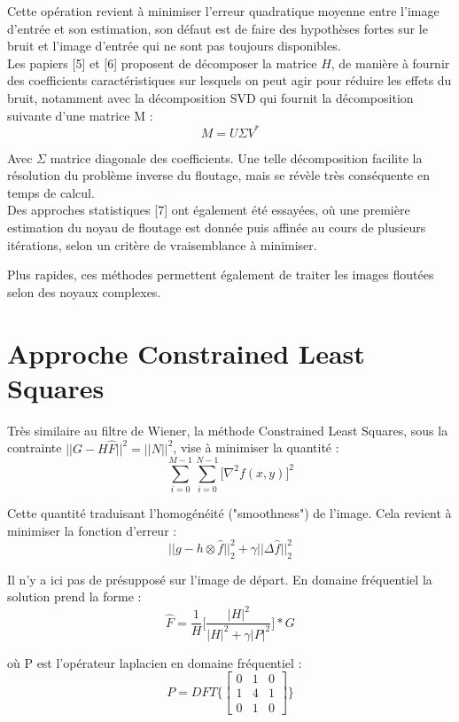 \documentclass{article}
\begin{document}
	Cette opération revient à minimiser l'erreur quadratique moyenne entre l'image d'entrée et son estimation, son défaut est de faire des hypothèses fortes sur le bruit et l'image d'entrée qui ne sont pas toujours disponibles.
	\\
	
	Les papiers [5] et [6] proposent de décomposer la matrice $H$, de manière à fournir des coefficients caractéristiques sur lesquels on peut agir pour réduire les effets du bruit, notamment avec la décomposition SVD qui fournit la décomposition suivante d'une matrice M :
	$$ M = U \Sigma V^*$$
	
	Avec $\Sigma$ matrice diagonale des coefficients. Une telle décomposition facilite la résolution du problème inverse du floutage, mais se révèle très conséquente en temps de calcul.
	\\
	
	Des approches statistiques [7] ont également été essayées, où une première estimation du noyau de floutage est donnée puis affinée au cours de plusieurs itérations, selon un critère de vraisemblance à minimiser.
	
	Plus rapides, ces méthodes permettent également de traiter les images floutées selon des noyaux complexes.
	\newpage
	
	
\section{Approche Constrained Least Squares}
\label{sec:typestyle}

	Très similaire au filtre de Wiener, la méthode Constrained Least Squares, sous la contrainte $||G - H \hat{F}||^2 = ||N||^2$, vise à minimiser la quantité :
	$$\sum\limits_{i=0}^{M-1} \sum\limits_{i=0}^{N-1} \big[\nabla ^2 f(x,y)]^2 $$
	
	Cette quantité traduisant l'homogénéité ("smoothness") de l'image. Cela revient à minimiser la fonction d'erreur :
	$$||g - h \otimes \hat{f}||^2 _2 + \gamma ||\Delta \hat{f}||^2 _2$$
	
	Il n'y a ici pas de présupposé sur l'image de départ.
	En domaine fréquentiel la solution prend la forme :
	$$\hat F = \frac {1}{H} \bigg[ \frac {|H|^2}{|H|^2 + \gamma |P|^2 } \bigg] * G$$ 
	
	où P est l'opérateur laplacien en domaine fréquentiel : 
	$$ P = DFT\bigg\{\begin{bmatrix}
		0 & 1 & 0 \\
		1 & 4 & 1 \\
		0 & 1 & 0 
		\end{bmatrix}\bigg\}$$
		
\end{document}
